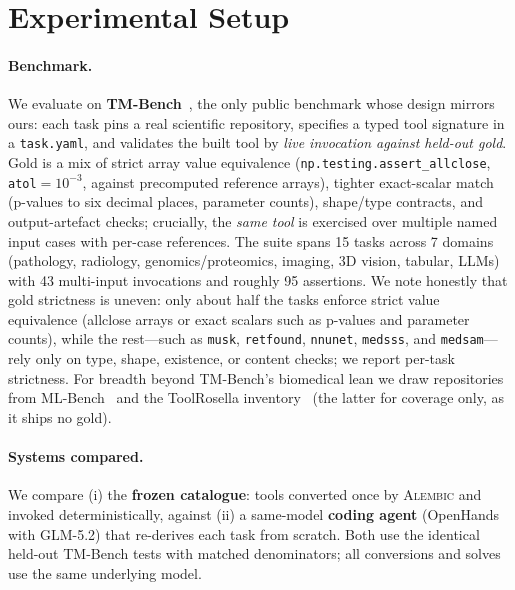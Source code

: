 \section{Experimental Setup}

\paragraph{Benchmark.}
We evaluate on \textbf{TM-Bench}~\citep{wolflein2025toolmaker_acl}, the only
public benchmark whose design mirrors ours: each task pins a real scientific
repository, specifies a typed tool signature in a \texttt{task.yaml}, and
validates the built tool by \emph{live invocation against held-out gold}. Gold
is a mix of strict array value equivalence
(\texttt{np.testing.assert\_allclose}, \texttt{atol}$=$$10^{-3}$, against
precomputed reference arrays), tighter exact-scalar match (p-values to six
decimal places, parameter counts),
shape/type contracts, and output-artefact checks; crucially, the \emph{same
tool} is exercised over multiple named input cases with per-case references. The
suite spans 15 tasks across 7 domains (pathology, radiology, genomics/proteomics,
imaging, 3D vision, tabular, LLMs) with 43 multi-input invocations and roughly
95 assertions. We note honestly that gold strictness is uneven: only about half
the tasks enforce strict value equivalence (allclose arrays or exact scalars
such as p-values and parameter counts), while the rest---such as \texttt{musk},
\texttt{retfound}, \texttt{nnunet}, \texttt{medsss}, and \texttt{medsam}---rely
only on type, shape, existence, or content checks; we report per-task strictness. For breadth beyond
TM-Bench's biomedical lean we draw repositories from
ML-Bench~\citep{tang2024mlbench} and the ToolRosella
inventory~\citep{toolrosella2026} (the latter for coverage only, as it ships no
gold).

\paragraph{Systems compared.}
We compare (i) the \textbf{frozen catalogue}: tools converted once by
\textsc{Alembic} and invoked deterministically, against (ii) a same-model
\textbf{coding agent} (OpenHands with GLM-5.2) that re-derives each task from
scratch. Both use the identical held-out TM-Bench tests with matched
denominators; all conversions and solves use the same underlying model.

